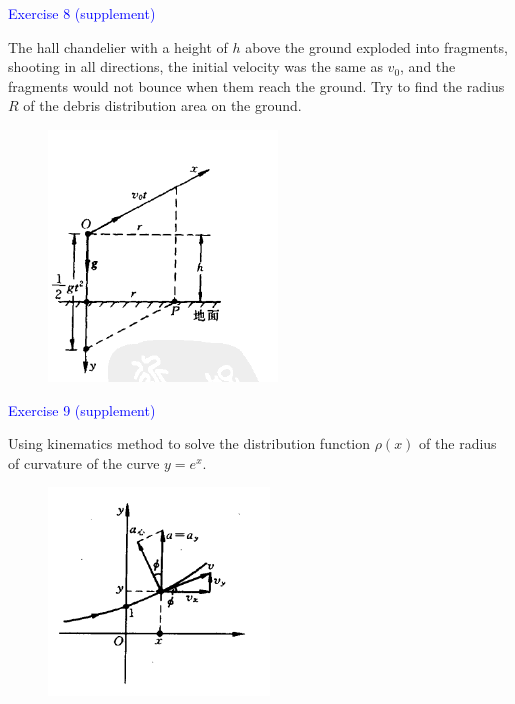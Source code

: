 \documentclass{beamer}
\begin{document}
\begin{frame}
\textcolor{blue}{Exercise 8 (supplement)}

The hall chandelier with a height of $h$ above the ground exploded into fragments, shooting in all directions, the initial velocity was the same as $v_0$, and the fragments would not bounce when them reach the ground. Try to find the radius $R$ of the debris distribution area on the ground.
\begin{figure}[htbp]
\centering
\includegraphics[width=0.4 \linewidth, angle =0]{ex8.png}
\label{fig:3}
\end{figure}
\end{frame}

\begin{frame}
\textcolor{blue}{Exercise 9 (supplement)}

Using kinematics method to solve the distribution function $\rho(x)$ of the radius of curvature of the curve $y=e^x$.
\begin{figure}[htbp]
\centering
\includegraphics[width=0.45 \linewidth, angle =0]{ex9.png}
\label{fig:4}
\end{figure}
\end{frame}
\end{document}
